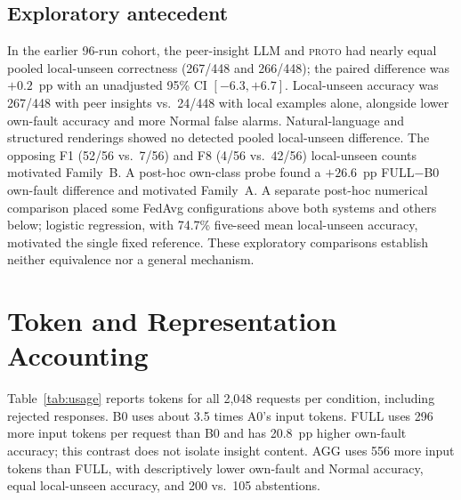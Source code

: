 \documentclass[conference]{IEEEtran}
\newcommand{\PROTO}{\textsc{proto}}
\newcommand{\cond}[1]{\textsf{#1}}
\begin{document}
\begin{table}[t]
\centering\footnotesize
\caption{Exploratory gpt-oss accuracy at the planned denominators: 192 own-fault, 1,344 local-unseen and 512 Normal pairs per condition. Abstentions out of 2,048 remain non-correct; no rejected, truncated or missing responses occurred.}
\label{tab:supplement}
\setlength{\tabcolsep}{3pt}

\end{table}

\subsection{Exploratory antecedent}
In the earlier 96-run cohort, the peer-insight LLM and \PROTO{} had nearly equal pooled local-unseen correctness (267/448 and 266/448); the paired difference was $+0.2$~pp with an unadjusted 95\% CI $[-6.3,+6.7]$. Local-unseen accuracy was 267/448 with peer insights vs.\ 24/448 with local examples alone, alongside lower own-fault accuracy and more Normal false alarms. Natural-language and structured renderings showed no detected pooled local-unseen difference. The opposing F1 (52/56 vs.\ 7/56) and F8 (4/56 vs.\ 42/56) local-unseen counts motivated Family~B. A post-hoc own-class probe found a $+26.6$~pp \cond{FULL}$-$\cond{B0} own-fault difference and motivated Family~A. A separate post-hoc numerical comparison placed some FedAvg configurations above both systems and others below; logistic regression, with 74.7\% five-seed mean local-unseen accuracy, motivated the single fixed reference. These exploratory comparisons establish neither equivalence nor a general mechanism.


\section{Token and Representation Accounting}
\label{sec:cost}
Table~\ref{tab:usage} reports tokens for all 2,048 requests per condition, including rejected responses. \cond{B0} uses about 3.5 times \cond{A0}'s input tokens. \cond{FULL} uses 296 more input tokens per request than \cond{B0} and has 20.8~pp higher own-fault accuracy; this contrast does not isolate insight content. \cond{AGG} uses 556 more input tokens than \cond{FULL}, with descriptively lower own-fault and Normal accuracy, equal local-unseen accuracy, and 200 vs.\ 105 abstentions.

\begin{table}[t]
\centering\footnotesize
\caption{LLM mean tokens per request, rounded to integers, including all 2,048 requests per condition and all response states. Reasoning-token detail was not reported.}
\label{tab:usage}
\setlength{\tabcolsep}{7pt}

\end{table}
\end{document}

